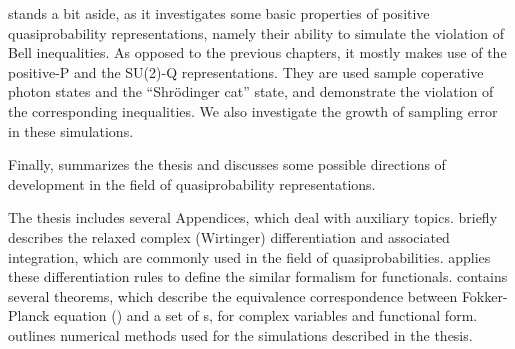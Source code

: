  stands a bit aside, as it investigates some basic properties of positive quasiprobability representations, namely their ability to simulate the violation of Bell inequalities.
As opposed to the previous chapters, it mostly makes use of the positive-P and the SU(2)-Q representations.
They are used sample coperative photon states and the ``Shr\"odinger cat'' state, and demonstrate the violation of the corresponding inequalities.
We also investigate the growth of sampling error in these simulations.

Finally,  summarizes the thesis and discusses some possible directions of development in the field of quasiprobability representations.

The thesis includes several Appendices, which deal with auxiliary topics.
 briefly describes the relaxed complex (Wirtinger) differentiation and associated integration, which are commonly used in the field of quasiprobabilities.
 applies these differentiation rules to define the similar formalism for functionals.
 contains several theorems, which describe the equivalence correspondence between Fokker-Planck equation () and a set of s, for complex variables and functional form.
 outlines numerical methods used for the simulations described in the thesis.
